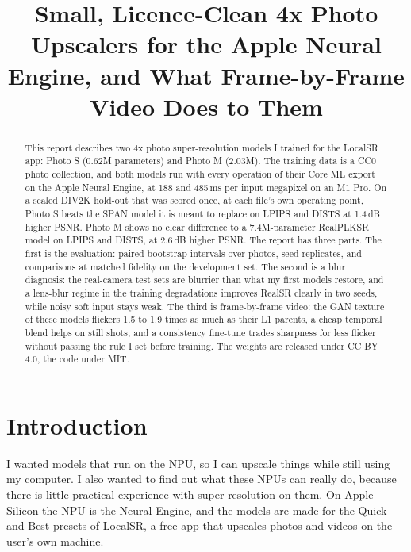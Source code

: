 \documentclass[conference]{IEEEtran}
\begin{document}
\title{Small, Licence-Clean 4x Photo Upscalers for the Apple Neural Engine, and What Frame-by-Frame Video Does to
Them}
\author{
}
\maketitle

\begin{abstract}
This report describes two 4x photo super-resolution models I trained for the LocalSR app: Photo S (0.62M parameters)
and Photo M (2.03M). The training data is a CC0 photo collection, and both models run with every operation of their
Core ML export on the Apple Neural Engine, at 188 and 485\,ms per input megapixel on an M1 Pro. On a sealed DIV2K
hold-out that was scored once, at each file's own operating point, Photo S beats the SPAN model it is meant to replace
on LPIPS and DISTS at 1.4\,dB higher PSNR. Photo M shows no clear difference to a 7.4M-parameter RealPLKSR model on
LPIPS and DISTS, at 2.6\,dB higher PSNR. The report has three parts. The first is the evaluation: paired bootstrap
intervals over photos, seed replicates, and comparisons at matched fidelity on the development set. The second is a
blur diagnosis: the real-camera test sets are blurrier than what my first models restore, and a lens-blur regime in
the training degradations improves RealSR clearly in two seeds, while noisy soft input stays weak. The third is
frame-by-frame video: the GAN texture of these models flickers 1.5 to 1.9 times as much as their L1 parents, a cheap
temporal blend helps on still shots, and a consistency fine-tune trades sharpness for less flicker without passing
the rule I set before training. The weights are released under CC BY 4.0, the code under MIT.
\end{abstract}

\section{Introduction}

I wanted models that run on the NPU, so I can upscale things while still using my computer. I also wanted to
find out what these NPUs can really do, because there is little practical experience with super-resolution on
them. On Apple Silicon the NPU is
the Neural Engine, and the models are made for the Quick and Best presets of LocalSR, a free app that upscales
photos and videos on the user's own machine.
\end{document}
